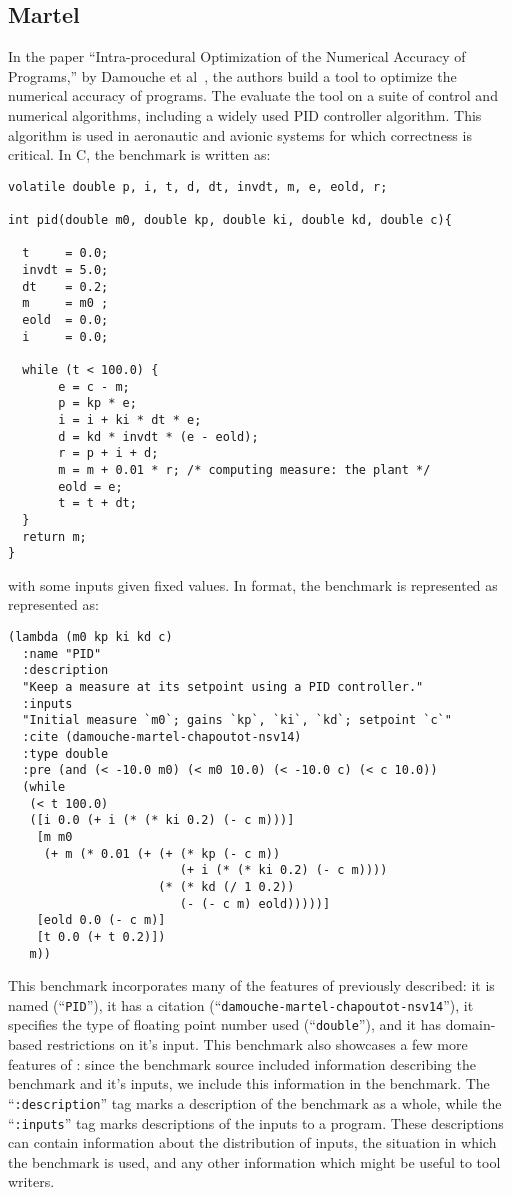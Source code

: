 \documentclass[main.tex]{subfiles}
\begin{document}
\subsection{Martel}
In the paper ``Intra-procedural Optimization of the Numerical Accuracy
of Programs,'' by Damouche et al~\cite{fmics15}, the authors build a
tool to optimize the numerical accuracy of programs. The evaluate the
tool on a suite of control and numerical algorithms, including a
widely used PID controller algorithm. This algorithm is used in
aeronautic and avionic systems for which correctness is critical. In
C, the benchmark is written as:

\begin{verbatim}
volatile double p, i, t, d, dt, invdt, m, e, eold, r; 

int pid(double m0, double kp, double ki, double kd, double c){

  t     = 0.0;
  invdt = 5.0;
  dt    = 0.2;
  m     = m0 ;
  eold  = 0.0;
  i     = 0.0;
  
  while (t < 100.0) {
       e = c - m;
       p = kp * e;
       i = i + ki * dt * e;
       d = kd * invdt * (e - eold);
       r = p + i + d;
       m = m + 0.01 * r; /* computing measure: the plant */
       eold = e;
       t = t + dt;
  }
  return m;
}
\end{verbatim}

with some inputs given fixed values. In \core format, the benchmark
is represented as represented as:

\begin{verbatim}
(lambda (m0 kp ki kd c)
  :name "PID"
  :description 
  "Keep a measure at its setpoint using a PID controller."
  :inputs 
  "Initial measure `m0`; gains `kp`, `ki`, `kd`; setpoint `c`"
  :cite (damouche-martel-chapoutot-nsv14)
  :type double
  :pre (and (< -10.0 m0) (< m0 10.0) (< -10.0 c) (< c 10.0))
  (while
   (< t 100.0)
   ([i 0.0 (+ i (* (* ki 0.2) (- c m)))]
    [m m0
     (+ m (* 0.01 (+ (+ (* kp (- c m))
                        (+ i (* (* ki 0.2) (- c m))))
                     (* (* kd (/ 1 0.2))
                        (- (- c m) eold)))))]
    [eold 0.0 (- c m)]
    [t 0.0 (+ t 0.2)])
   m))
\end{verbatim}

This benchmark incorporates many of the features of \core previously
described: it is named (``\verb|PID|''), it has a citation
(``\verb|damouche-martel-chapoutot-nsv14|''), it specifies the type of
floating point number used (``\verb|double|''), and it has
domain-based restrictions on it's input. This benchmark also showcases
a few more features of \core: since the benchmark source included
information describing the benchmark and it's inputs, we include this
information in the \name benchmark. The ``\verb|:description|'' tag
marks a description of the benchmark as a whole, while the
``\verb|:inputs|'' tag marks descriptions of the inputs to a
program. These descriptions can contain information about the
distribution of inputs, the situation in which the benchmark is used,
and any other information which might be useful to tool writers.
\end{document}
